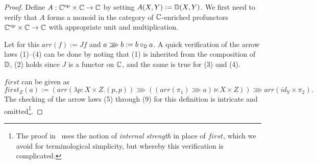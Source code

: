 \begin{proof}
    Define $A: {\mathbb{C}}^{\text{op}} \times \mathbb{C} \to \mathbb{C}$ by setting $A(X, Y) :=
    \mathbb{D}(X,Y)$. We first need to verify that $A$ forms a monoid in the category
    of $\mathbb{C}$-enriched profunctors ${\mathbb{C}}^{\text{op}} \times \mathbb{C} \to \mathbb{C}$ with
    appropriate unit and multiplication.

    Let for this $arr(f) := Jf$ and $a \ggg b := b \circ_{\mathbb{D}} a$. A quick
    verification of the arrow laws (1)--(4) can be done by noting that (1) is
    inherited from the composition of $\mathbb{D}$, (2) holds since $J$ is a functor
    on $\mathbb{C}$, and the same is true for (3) and (4).

    $first$ can be given as
    \[
        first_Z(a) := (arr(\lambda p : X \times Z. (p, p))
          \ggg ((arr(\pi_1) \ggg a) \ltimes X \times Z))
          \ggg arr(id_Y \times \pi_2).
    \]
    The checking of the arrow laws (5) through (9) for this definition is intricate
    and omitted\footnote{The proof in~\cite{cat-semantics-arr} uses the notion
    of \emph{internal strength} in place of $first$, which we avoid for
    terminological simplicity, but whereby this verification is complicated.}.

\end{proof}
